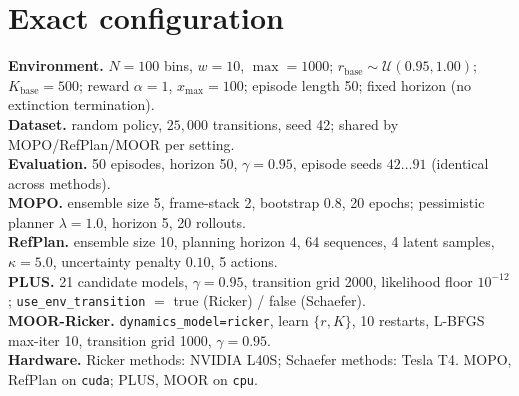 \documentclass[11pt]{article}
\newcommand{\rbase}{r_{\mathrm{base}}}
\begin{document}
\appendix
\section{Exact configuration}
\small
\noindent\textbf{Environment.} $N=100$ bins, $w=10$, $\max=1000$;
$\rbase\sim\mathcal{U}(0.95,1.00)$; $K_{\mathrm{base}}=500$; reward $\alpha=1$,
$x_{\max}=100$; episode length 50; fixed horizon (no extinction termination).\\
\textbf{Dataset.} random policy, $25{,}000$ transitions, seed 42; shared by
MOPO/RefPlan/MOOR per setting.\\
\textbf{Evaluation.} 50 episodes, horizon 50, $\gamma=0.95$, episode seeds
$42\dots91$ (identical across methods).\\
\textbf{MOPO.} ensemble size 5, frame-stack 2, bootstrap 0.8, 20 epochs;
pessimistic planner $\lambda=1.0$, horizon 5, 20 rollouts.\\
\textbf{RefPlan.} ensemble size 10, planning horizon 4, 64 sequences, 4 latent
samples, $\kappa=5.0$, uncertainty penalty $0.10$, 5 actions.\\
\textbf{PLUS.} 21 candidate models, $\gamma=0.95$, transition grid 2000,
likelihood floor $10^{-12}$; \texttt{use\_env\_transition} $=$ true (Ricker) /
false (Schaefer).\\
\textbf{MOOR-Ricker.} \texttt{dynamics\_model=ricker}, learn $\{r,K\}$, 10
restarts, L-BFGS max-iter 10, transition grid 1000, $\gamma=0.95$.\\
\textbf{Hardware.} Ricker methods: NVIDIA L40S; Schaefer methods: Tesla T4. MOPO,
RefPlan on \texttt{cuda}; PLUS, MOOR on \texttt{cpu}.
\end{document}
